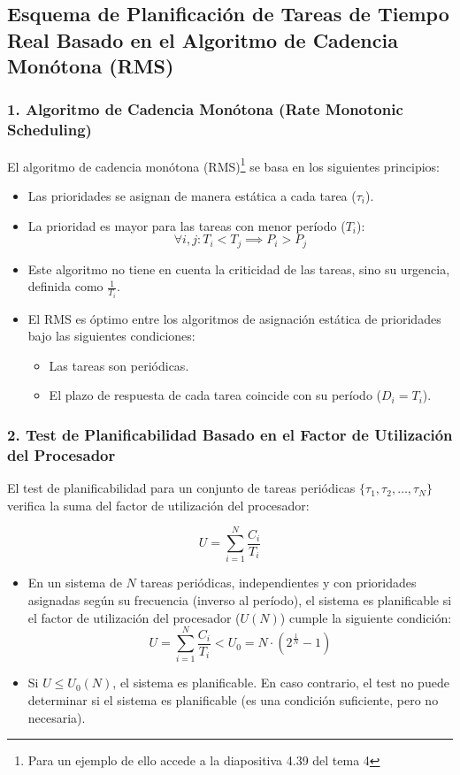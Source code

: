 \documentclass[a4paper,12pt]{article}
\begin{document}
\subsection{Esquema de Planificación de Tareas de Tiempo Real Basado en el Algoritmo de Cadencia Monótona (RMS)}

\subsubsection{1. Algoritmo de Cadencia Monótona (Rate Monotonic Scheduling)}

El algoritmo de cadencia monótona (RMS)\footnote{Para un ejemplo de ello accede  a la diapositiva 4.39 del tema 4} se basa en los siguientes principios:

\begin{itemize}
    \item Las prioridades se asignan de manera estática a cada tarea (\(\tau_i\)).
    \item La prioridad es mayor para las tareas con menor período (\(T_i\)):
    \[
    \forall i, j : T_i < T_j \implies P_i > P_j
    \]
    \item Este algoritmo no tiene en cuenta la criticidad de las tareas, sino su urgencia, definida como \( \frac{1}{T_i} \).
    \item El RMS es óptimo entre los algoritmos de asignación estática de prioridades bajo las siguientes condiciones:
    \begin{itemize}
        \item Las tareas son periódicas.
        \item El plazo de respuesta de cada tarea coincide con su período (\(D_i = T_i\)).
    \end{itemize}
\end{itemize}

\subsubsection{2. Test de Planificabilidad Basado en el Factor de Utilización del Procesador}

El test de planificabilidad para un conjunto de tareas periódicas \(\{\tau_1, \tau_2, \ldots, \tau_N\}\) verifica la suma del factor de utilización del procesador:

\[
U = \sum_{i=1}^N \frac{C_i}{T_i}
\]

\begin{itemize}
    \item En un sistema de \(N\) tareas periódicas, independientes y con prioridades asignadas según su frecuencia (inverso al período), el sistema es planificable si el factor de utilización del procesador (\(U(N)\)) cumple la siguiente condición:
    \[
    U = \sum_{i=1}^N \frac{C_i}{T_i} < U_0 = N \cdot (2^{\frac{1}{N}} - 1)
    \]
    \item Si \(U \leq U_0(N)\), el sistema es planificable. En caso contrario, el test no puede determinar si el sistema es planificable (es una condición suficiente, pero no necesaria).
\end{itemize}
\end{document}
